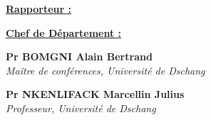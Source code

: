 \vspace{2em}

\noindent
\begin{minipage}[t]{0.47\linewidth}
\raggedright \underline{\textbf{Rapporteur :}}
\end{minipage}%
\hfill
\begin{minipage}[t]{0.47\linewidth}
\raggedright \underline{\textbf{Chef de Département :}}
\end{minipage}

\vspace{5.5em}

\noindent
\begin{minipage}[t]{0.47\linewidth}
\raggedright \textbf{Pr BOMGNI Alain Bertrand}\\[0.15em]
{\itshape\small Maître de conférences, Université de Dschang}
\end{minipage}%
\hfill
\begin{minipage}[t]{0.47\linewidth}
\raggedright \textbf{Pr NKENLIFACK Marcellin Julius}\\[0.15em]
{\itshape\small Professeur, Université de Dschang}
\end{minipage}

\vspace{1.5em}


